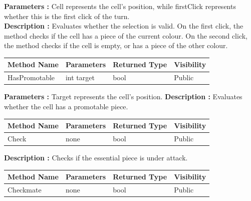 \documentclass[12pt]{article}
\begin{document}
\textbf{Parameters :} Cell represents the cell's position, while firstClick represents whether this is the first click of the turn. 
\\

\textbf{Description :} Evaluates whether the selection is valid.
On the first click, the method checks if the cell has a piece of the current colour.
On the second click, the method checks if the cell is empty, or has a piece of the other colour.

\begin{table}[H]
    \begin{tabular}{|l|l|l|l|}
    \hline
    \rowcolor[HTML]{EFEFEF} 
    \cellcolor[HTML]{EFEFEF}\textbf{Method Name} & \textbf{Parameters}     & \textbf{Returned Type} & \textbf{Visibility} \\ \hline
    HasPromotable                                & int target                    & bool                   & Public              \\ \hline
    \end{tabular}
\end{table}


\textbf{Parameters :} Target represents the cell's position.  
\textbf{Description :} Evaluates whether the cell has a promotable piece. 

\begin{table}[H]
    \begin{tabular}{|l|l|l|l|}
    \hline
    \rowcolor[HTML]{EFEFEF} 
    \cellcolor[HTML]{EFEFEF}\textbf{Method Name} & \textbf{Parameters}     & \textbf{Returned Type} & \textbf{Visibility} \\ \hline
    Check                                        & none                    & bool                   & Public              \\ \hline
    \end{tabular}
\end{table}

\textbf{Description :} Checks if the essential piece is under attack.  

\begin{table}[H]
    \begin{tabular}{|l|l|l|l|}
    \hline
    \rowcolor[HTML]{EFEFEF} 
    \cellcolor[HTML]{EFEFEF}\textbf{Method Name} & \textbf{Parameters}     & \textbf{Returned Type} & \textbf{Visibility} \\ \hline
    Checkmate                                        & none                    & bool                   & Public              \\ \hline
    \end{tabular}
\end{table}
\end{document}
